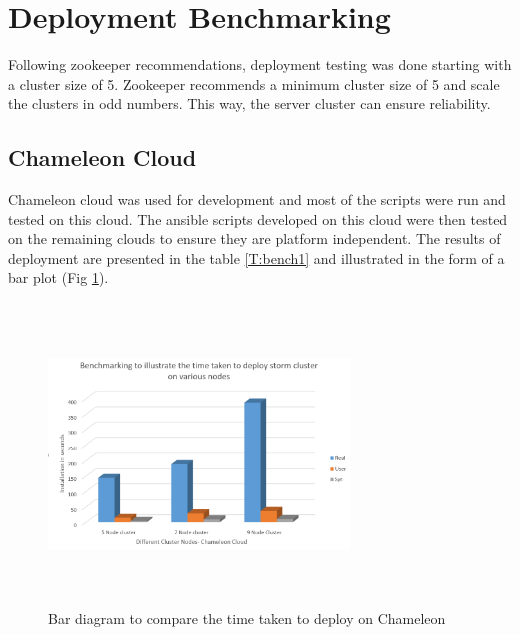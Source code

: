\documentclass[9pt,twocolumn,twoside]{../../styles/osajnl}
\begin{document}
\section{Deployment Benchmarking}
Following zookeeper recommendations, deployment testing was done
starting with a cluster size of 5. Zookeeper recommends a minimum
cluster size of 5 and scale the clusters in odd numbers. This way, the
server cluster can ensure reliability.

\subsection{Chameleon Cloud}
Chameleon cloud was used for development and most of the scripts were
run and tested on this cloud. The ansible scripts developed on this cloud were
then tested on the remaining clouds to ensure they are platform
independent. The results of deployment are presented in the table
\ref{T:bench1} and illustrated in the form of a bar plot (Fig
\ref{barc}).

\begin{table}[htb]
\centering
\caption{Table illustrating the various times it took to deploy on Chameleon cloud}\label{T:bench1}
\end{table}

\begin{figure}[!htb]
  \includegraphics[width=8cm,height=8cm,keepaspectratio,width=\linewidth]{images/bar-1.png}
  \caption{Bar diagram to compare the time taken to deploy on Chameleon}
  \label{barc}
\end{figure}
\end{document}
